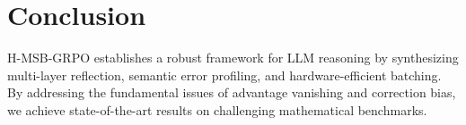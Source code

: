 \documentclass[letterpaper]{article}
\begin{document}
\section{Conclusion}
H-MSB-GRPO establishes a robust framework for LLM reasoning by synthesizing multi-layer reflection, semantic error profiling, and hardware-efficient batching. By addressing the fundamental issues of advantage vanishing and correction bias, we achieve state-of-the-art results on challenging mathematical benchmarks.



\end{document}
